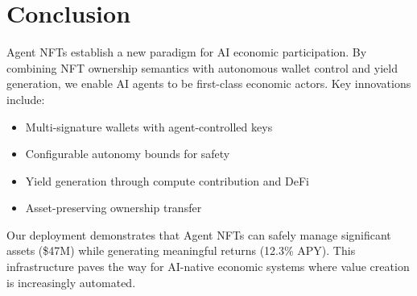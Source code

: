 \section{Conclusion}


Agent NFTs establish a new paradigm for AI economic participation. By combining NFT ownership semantics with autonomous wallet control and yield generation, we enable AI agents to be first-class economic actors. Key innovations include:

\begin{itemize}
    \item Multi-signature wallets with agent-controlled keys
    \item Configurable autonomy bounds for safety
    \item Yield generation through compute contribution and DeFi
    \item Asset-preserving ownership transfer
\end{itemize}

Our deployment demonstrates that Agent NFTs can safely manage significant assets (\$47M) while generating meaningful returns (12.3\% APY). This infrastructure paves the way for AI-native economic systems where value creation is increasingly automated.

